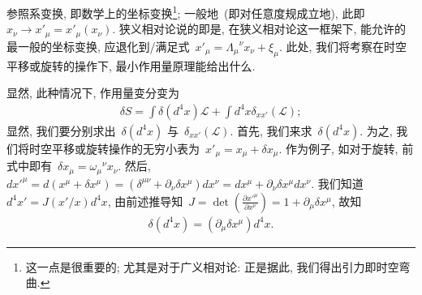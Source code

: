 参照系变换, 即数学上的坐标变换\footnote{这一点是很重要的; 尤其是对于广义相对论: 正是据此, 我们得出引力即时空弯曲.}; 一般地~(即对任意度规成立地), 此即~$x_\nu\rightarrow x'_\mu=x'_\mu(x_\nu)$. 狭义相对论说的即是, 在狭义相对论这一框架下, 能允许的最一般的坐标变换, 应退化到/满足式~$x'_\mu={\Lambda_\mu}^\nu x_\nu+\xi_\mu$. 此处, 我们将考察在时空平移或旋转的操作下, 最小作用量原理能给出什么.

显然, 此种情况下, 作用量变分变为
\begin{align}
\delta S=\int\delta(d^4x)\mathcal{L}+\int d^4x\delta_{xx'}(\mathcal{L});
\end{align}
显然, 我们要分别求出~$\delta(d^4x)$ 与~$\delta_{xx'}(\mathcal{L})$. 首先, 我们来求~$\delta(d^4x)$. 为之, 我们将时空平移或旋转操作的无穷小表为~$x'_\mu=x_\mu+\delta x_\mu$. 作为例子, 如对于旋转, 前式中即有~$\delta x_\mu={\omega_\mu}^\nu x_\nu$. 然后, $dx'^\mu=d(x^\mu+\delta x^\mu)=(\delta^{\mu\nu}+\partial_\nu\delta x^\mu)dx^\nu=dx^\mu+\partial_\nu\delta x^\mu dx^\nu$. 我们知道~$d^4x'=J(x'/x)d^4x$, 由前述推导知~$J=\det(\frac{\partial x'^\mu}{\partial x^\nu})=1+\partial_\mu \delta x^\mu$, 故知
\begin{align}
\delta(d^4x)=(\partial_\mu\delta x^\mu)d^4x.
\end{align}

